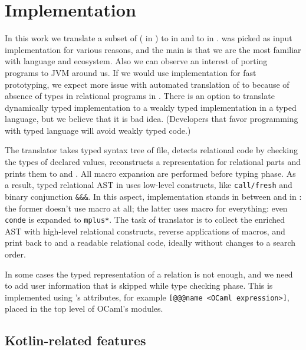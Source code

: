 
\section{Implementation}
\label{sec:implementation}

In this work we translate a subset of \OCanren{} (\miniKanren{} in \OCaml{})  to \miniKanren in \Scheme{} and to \Klogic{} in \Kotlin{}.
\OCanren{} was picked as input implementation for various reasons, and the main is that we are the most familiar with \OCaml{} language and ecosystem.
Also we can observe an interest of porting \OCanren{} programs to JVM around us.
If we would use \Scheme{} implementation for fast prototyping, we expect more issue with automated translation of \Scheme{} to \Kotlin{} because of absence of types in relational programs in \Scheme{}.
There is an option to translate dynamically typed implementation to a weakly typed implementation in a typed language, but we believe that it is bad idea. (Developers that favor programming with typed language will avoid weakly typed code.)

The translator takes typed syntax tree of \OCaml{} file, detects relational code by checking the types of declared values, reconstructs a representation for relational parts and prints them to \Kotlin{} and \Scheme{}.
All macro expansion are performed before typing phase.
As a result, typed relational AST in \OCaml{} uses low-level constructs, like \verb=call/fresh= and binary conjunction \verb=&&&=.
In this aspect, \OCanren{} implementation stands in between \Klogic{} and \miniKanren in \Scheme{}: the former doesn't use macro at all; the latter uses macro for everything: even \verb=conde= is expanded to \verb=mplus*=.
The task of translator is to collect the enriched AST with high-level relational constructs, reverse applications of macros, and print back to \Klogic{} and \Scheme{} a readable relational code, ideally without changes to a search order.

In some cases the typed representation of a relation is not enough, and we need to add user information that is skipped while type checking phase.
This is implemented using \OCaml{}'s attributes, for example \verb=[@@@name <OCaml expression>]=, placed in the top level of OCaml's modules.

\subsection{Kotlin-related features}

